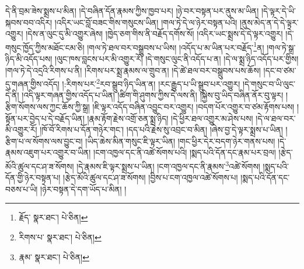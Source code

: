 དེ་ནི་བྲམ་ཟེས་སྨྲས་པ་མིན། །དེ་བཞིན་དོན་རྣམས་ཀྱིས་ཁྱབ་པར། །ཉེ་བར་བསྟན་པར་ནུས་མ་ཡིན། །དེ་ལྟར་དེ་ཡི་སྐབས་བབ་འདིར། །འདིར་ཡང་བློ་བཟང་གིས་གསུངས་ཡིན། །གལ་ཏེ་དེ་ལ་ཉེར་བསྟན་པའི། །ནུས་མེད་ན་དེ་དེ་ལྟར་འགྱུར། །དེས་ན་ལུང་དུ་མི་འགྱུར་ཞེས། །ཁྱེད་ཅག་གིས་ནི་བརྗོད་དགོས་སོ། །འདིར་ཡང་སྨྲས་དེ་དེ་ལྟར་འགྱུར། །དེ་གསུང་ཁྱོད་ཀྱིས་མཐོང་ངམ་ཅི། །གལ་ཏེ་ཐལ་བར་བསྒྲུབས་པ་ཡིས། །འདོད་པ་མ་ཡིན་པར་བརྗོད་\footnote{རྗོད་  སྣར་ཐང་།  པེ་ཅིན། }ན། །གལ་ཏེ་སྒྲ་ཉིད་མི་འདོད་པས། །ལུང་ཁས་བླངས་པར་མི་འགྱུར་རོ། །དེ་གསུང་ལུང་ནི་འདོད་པ་ན། །དེ་ལ་སྨྲ་ཉིད་འདོད་པར་གྱིས། །གལ་ཏེ་དེ་འདྲའི་རིགས་པ་ནི། །རིགས་པར་སྨྲ་རྣམས་ལ་གྲུབ་ན། །དེ་ཚེ་ཐལ་བར་བསྒྲུབས་པས་ཆོས། །དང་བ་ཙམ་དུ་གཞན་གྱིས་འདོད། །:རིགས་པར་\footnote{རིགས་པ་  སྣར་ཐང་།  པེ་ཅིན། }རབ་སྒྲུབ་ཉིད་ཡིན་ན། །རང་རྒྱུད་པ་ཡི་སྒྲུབ་པར་འགྱུར། །དེ་གསུང་བ་ཡི་ལུང་དེ་ནི། །འདི་ལྟར་གཞན་གྱིས་འདོད་པ་ཡིན། །ཚིག་གི་ཤུགས་ཀྱིས་དེ་ལས་ནི། །སྐྱེས་བུ་ཡིད་བཞིན་ནོར་བུ་ལྟར། །རྩིག་སོགས་ལས་ཀྱང་ཆོས་ཀྱི་སྒྲ། །ཇི་ལྟར་འདོད་བཞིན་འབྱུང་བར་འགྱུར། །བདག་པོར་འགྱུར་བ་ཙམ་རྟོགས་པས། །སྟོན་པར་བྱེད་པ་དེ་བརྗོད་ཡིན། །རྣམ་རྟོག་རྗེས་འགྲོ་ཅན་སྨྲ་ཉིད། །དེ་ཕྱིར་ཐལ་འགྱུར་མ་ཤེས་པས། །དེ་ལ་ཐལ་བར་མི་འགྱུར་རོ། །ཁོ་བོ་རིགས་པ་དོན་གཉེར་གང་། །དད་པའི་རྗེས་སུ་འབྲང་བ་མིན། །ཞེས་བྱ་དེ་ལྟར་སྨྲས་པ་ཡིན། །རྩིག་པ་ལ་སོགས་ལས་བྱུང་བ། །ཡིད་ཆེས་མིན་གསུང་ཇི་ལྟར་ཡིན། །གང་ཕྱིར་དེར་བདག་ཉེར་གནས་པས། །དེ་རྣམས་འཇུག་པར་འགྱུར་བ་ཡིན། །ངག་འཁྱལ་དང་ནི་འཚེ་སོགས་པའི། །སྨད་པའི་དོན་དང་རྣམ་པར་བྲལ། །རྩེད་མོའི་ཚུལ་དང་ཤ་ཟ་སོགས། །དེ་རྣམས་ཇི་ལྟར་སྨྲས་པ་ཡིན། །ངག་འཁྱལ་དང་ནི་རྣམས་\footnote{རྣམ་  སྣར་ཐང་།  པེ་ཅིན། }འཚེ་སོགས། །སྨད་པའི་དོན་གྱི་ཉེར་བསྟན་པ། །རྩེད་མོའི་ཚུལ་དང་ཤ་ཟ་སོགས། །བྱིས་པ་ངག་འཁྱལ་འཚེ་སོགས་པ། །སྨད་པའི་དོན་དང་བཅས་པ་ཡི། །ཉེར་བསྟན་དེ་དག་ཡོད་པ་མིན། །
